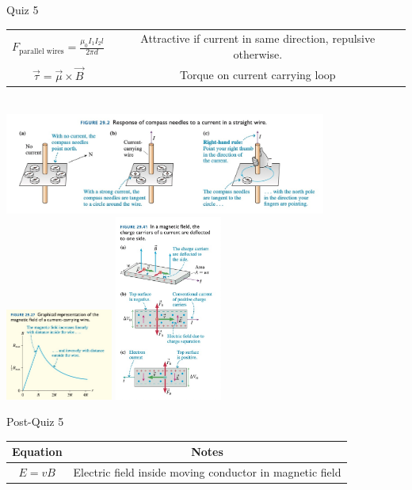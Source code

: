 \documentclass{article}
\begin{document}
\begin{center}
\begin{section}{Quiz 5}
\begin{tabular}{|c|c|}
		 $F_\text{parallel wires} =  \frac{\mu_0 I_1 I_2 l}{2 \pi d}$             & Attractive if current in same direction, repulsive otherwise.      \\

		 $\vec \tau = \vec \mu \times \vec B$                                     & Torque on current carrying loop                                    \\
		 \hline
	 \end{tabular}
	 \\
	 \includegraphics[width=300pt]{final_cheet_sheet_resources/aqszphbxmjmblmaspimhdejdjiugbttc.jpg}
	 \includegraphics[width=100pt]{final_cheet_sheet_resources/kaozdeuaxhzkquewempuyqchdccgvzoq.jpg}
	 \includegraphics[width=100pt]{final_cheet_sheet_resources/mgsmwhhorrooccpddtidybfkximnvaok.jpg}
	\end{section}

	\begin{section}{Post-Quiz 5}
	 \begin{tabular}{|c|c|}
		 \hline
		 Equation                                                                      & Notes                                                    \\
		 \hline

		 $E = vB$                                                                      & Electric field inside moving conductor in magnetic field \\


\end{tabular}
\end{section}
\end{center}
\end{document}
